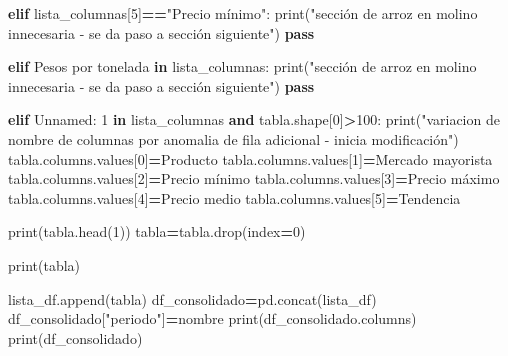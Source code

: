 \documentclass[
]{book}
\newenvironment{Shaded}{\begin{snugshade}}{\end{snugshade}}
\newcommand{\BuiltInTok}[1]{#1}
\newcommand{\ControlFlowTok}[1]{\textcolor[rgb]{0.13,0.29,0.53}{\textbf{#1}}}
\newcommand{\DecValTok}[1]{\textcolor[rgb]{0.00,0.00,0.81}{#1}}
\newcommand{\KeywordTok}[1]{\textcolor[rgb]{0.13,0.29,0.53}{\textbf{#1}}}
\newcommand{\NormalTok}[1]{#1}
\newcommand{\OperatorTok}[1]{\textcolor[rgb]{0.81,0.36,0.00}{\textbf{#1}}}
\newcommand{\StringTok}[1]{\textcolor[rgb]{0.31,0.60,0.02}{#1}}
\begin{document}
\begin{Shaded}
\begin{Highlighting}[]
            
            \ControlFlowTok{elif}\NormalTok{ lista\_columnas[}\DecValTok{5}\NormalTok{]}\OperatorTok{==}\StringTok{"Precio mínimo"}\NormalTok{:}
                \BuiltInTok{print}\NormalTok{(}\StringTok{"sección de arroz en molino innecesaria {-} se da paso a sección siguiente"}\NormalTok{)}
                \ControlFlowTok{pass}
            
            \ControlFlowTok{elif} \StringTok{\textquotesingle{}          Pesos por tonelada\textquotesingle{}} \KeywordTok{in}\NormalTok{ lista\_columnas:}
                \BuiltInTok{print}\NormalTok{(}\StringTok{"sección de arroz en molino innecesaria {-} se da paso a sección siguiente"}\NormalTok{)}
                \ControlFlowTok{pass}
            
              
            \ControlFlowTok{elif} \StringTok{\textquotesingle{}Unnamed: 1\textquotesingle{}} \KeywordTok{in}\NormalTok{ lista\_columnas }\KeywordTok{and}\NormalTok{ tabla.shape[}\DecValTok{0}\NormalTok{]}\OperatorTok{\textgreater{}}\DecValTok{100}\NormalTok{:}
                \BuiltInTok{print}\NormalTok{(}\StringTok{"variacion de nombre de columnas por anomalia de fila adicional {-} inicia modificación"}\NormalTok{)}
\NormalTok{                tabla.columns.values[}\DecValTok{0}\NormalTok{]}\OperatorTok{=}\StringTok{\textquotesingle{}Producto\textquotesingle{}}
\NormalTok{                tabla.columns.values[}\DecValTok{1}\NormalTok{]}\OperatorTok{=}\StringTok{\textquotesingle{}Mercado mayorista\textquotesingle{}}
\NormalTok{                tabla.columns.values[}\DecValTok{2}\NormalTok{]}\OperatorTok{=}\StringTok{\textquotesingle{}Precio mínimo\textquotesingle{}}
\NormalTok{                tabla.columns.values[}\DecValTok{3}\NormalTok{]}\OperatorTok{=}\StringTok{\textquotesingle{}Precio máximo\textquotesingle{}}
\NormalTok{                tabla.columns.values[}\DecValTok{4}\NormalTok{]}\OperatorTok{=}\StringTok{\textquotesingle{}Precio medio\textquotesingle{}}
\NormalTok{                tabla.columns.values[}\DecValTok{5}\NormalTok{]}\OperatorTok{=}\StringTok{\textquotesingle{}Tendencia\textquotesingle{}}
                
                \BuiltInTok{print}\NormalTok{(tabla.head(}\DecValTok{1}\NormalTok{))}
\NormalTok{                tabla}\OperatorTok{=}\NormalTok{tabla.drop(index}\OperatorTok{=}\DecValTok{0}\NormalTok{)}
                
                
                \BuiltInTok{print}\NormalTok{(tabla)}
                
\NormalTok{                lista\_df.append(tabla)}
\NormalTok{                df\_consolidado}\OperatorTok{=}\NormalTok{pd.concat(lista\_df)}
\NormalTok{                df\_consolidado[}\StringTok{"periodo"}\NormalTok{]}\OperatorTok{=}\NormalTok{nombre}
                \BuiltInTok{print}\NormalTok{(df\_consolidado.columns)   }
                \BuiltInTok{print}\NormalTok{(df\_consolidado)}
         

\end{Highlighting}
\end{Shaded}
\end{document}
